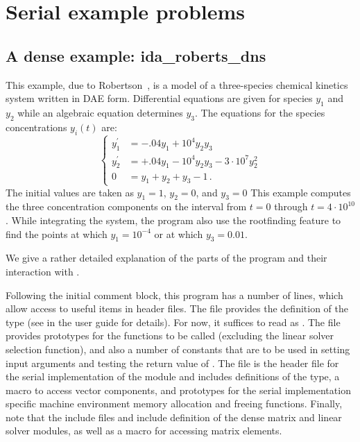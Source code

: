\section{Serial example problems}\label{s:ex_serial}

\subsection{A dense example: ida\_roberts\_dns}\label{ss:idaRoberts}

This example, due to Robertson~\cite{Rob:66}, is a model of a three-species 
chemical kinetics system written in DAE form. Differential equations are given 
for species $y_1$ and $y_2$ while an algebraic equation determines $y_3$. The 
equations for the species concentrations $y_i(t)$ are:
\begin{equation}\label{e:idaRoberts_DAE}
\begin{cases}
  y^\prime_1 &= -.04 y_1 + 10^4 y_2 y_3   \\
  y^\prime_2 &= +.04 y_1 - 10^4 y_2 y_3 - 3 \cdot 10^7 y_2^2  \\
  0 &=  y_1 + y_2 + y_3 - 1 \, .
\end{cases}
\end{equation}
The initial values are taken as $y_1 = 1$, $y_2 = 0$, and $y_3 = 0$
This example computes the three concentration components on the interval
from $t=0$ through $t=4 \cdot 10^{10}$.
While integrating the system, the program also use the rootfinding
feature to find the points at which $y_1 = 10^{-4}$ or at which
$y_3 = 0.01$.

We give a rather detailed explanation of the parts of the program and
their interaction with {\ida}.

Following the initial comment block, this program has a number
of  lines, which allow access to useful items in {\ida}
header files.  The  file provides the definition of the
type  (see  in the user guide \cite{ida_ug}
for details).  For now, it suffices to read  as .
The  file provides prototypes for the {\ida}
functions to be called (excluding the linear solver selection
function), and also a number of constants that are to be used in
setting input arguments and testing the return value of .
The  file is the header file for the serial
implementation of the {\nvector} module and includes definitions of the 
 type, a macro to access vector components, and prototypes 
for the serial implementation specific machine environment memory allocation
and freeing functions.
Finally, note that the include files  and
 include definition of the dense matrix and
linear solver modules, as well as a macro for accessing matrix elements.

